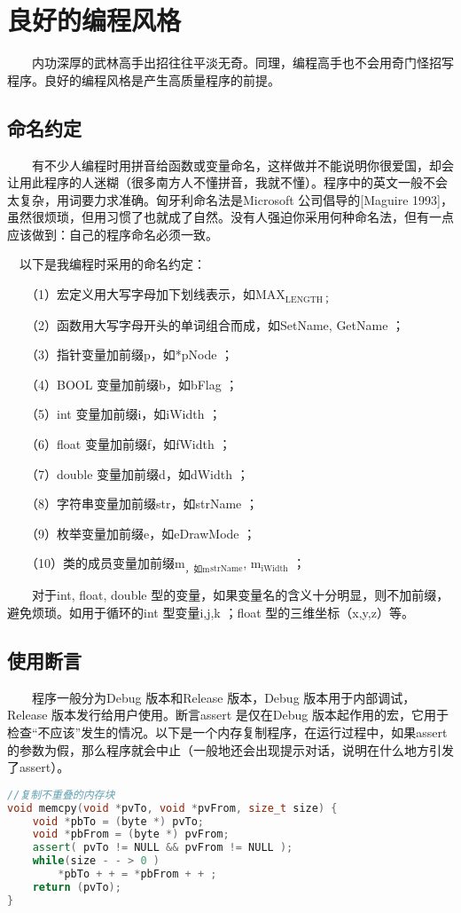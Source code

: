 \documentclass[11pt]{article}
\begin{document}
\section{良好的编程风格}
\label{sec-2}

　　内功深厚的武林高手出招往往平淡无奇。同理，编程高手也不会用奇门怪招写程序。良好的编程风格是产生高质量程序的前提。

\subsection{命名约定}
\label{sec-2-1}

　　有不少人编程时用拼音给函数或变量命名，这样做并不能说明你很爱国，却会让用此程序的人迷糊（很多南方人不懂拼音，我就不懂）。程序中的英文一般不会太复杂，用词要力求准确。匈牙利命名法是Microsoft 公司倡导的[Maguire 1993]，虽然很烦琐，但用习惯了也就成了自然。没有人强迫你采用何种命名法，但有一点应该做到：自己的程序命名必须一致。

　以下是我编程时采用的命名约定：

　　（1）宏定义用大写字母加下划线表示，如MAX$_{\text{LENGTH；}}$

　　（2）函数用大写字母开头的单词组合而成，如SetName, GetName ；

　　（3）指针变量加前缀p，如*pNode ；

　　（4）BOOL 变量加前缀b，如bFlag ；

　　（5）int 变量加前缀i，如iWidth ；

　　（6）float 变量加前缀f，如fWidth ；

　　（7）double 变量加前缀d，如dWidth ；

　　（8）字符串变量加前缀str，如strName ；

　　（9）枚举变量加前缀e，如eDrawMode ；

　　（10）类的成员变量加前缀m$_{\text{，如m}}$$_{\text{strName}}$, m$_{\text{iWidth}}$ ；

　　对于int, float, double 型的变量，如果变量名的含义十分明显，则不加前缀，避免烦琐。如用于循环的int 型变量i,j,k ；float 型的三维坐标（x,y,z）等。
\subsection{使用断言}
\label{sec-2-2}

　　程序一般分为Debug 版本和Release 版本，Debug 版本用于内部调试，Release 版本发行给用户使用。断言assert 是仅在Debug 版本起作用的宏，它用于检查“不应该”发生的情况。以下是一个内存复制程序，在运行过程中，如果assert 的参数为假，那么程序就会中止（一般地还会出现提示对话，说明在什么地方引发了assert）。
\begin{lstlisting}[language=c++]
//复制不重叠的内存块
void memcpy(void *pvTo, void *pvFrom, size_t size) {
    void *pbTo = (byte *) pvTo;
    void *pbFrom = (byte *) pvFrom;
    assert( pvTo != NULL && pvFrom != NULL );
    while(size - - > 0 )
        *pbTo + + = *pbFrom + + ;
    return (pvTo);
}
\end{lstlisting}
\end{document}
